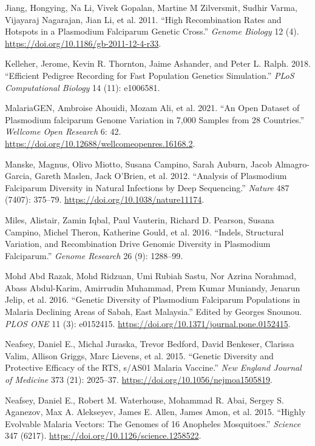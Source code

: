 \documentclass[
  11pt,
]{article}
\newlength{\cslhangindent}
\newenvironment{CSLReferences}[2] %
 {\begin{list}{}{%
  \setlength{\itemindent}{0pt}
  \setlength{\leftmargin}{0pt}
  \setlength{\parsep}{0pt}
  \ifodd #1
   \setlength{\leftmargin}{\cslhangindent}
   \setlength{\itemindent}{-1\cslhangindent}
  \fi
  \setlength{\itemsep}{#2\baselineskip}}}
 {\end{list}}
\begin{document}
\begin{CSLReferences}{1}{0}
Jiang, Hongying, Na Li, Vivek Gopalan, Martine M Zilversmit, Sudhir
Varma, Vijayaraj Nagarajan, Jian Li, et al. 2011. {``High Recombination
Rates and Hotspots in a Plasmodium Falciparum Genetic Cross.''}
\emph{Genome Biology} 12 (4).
\url{https://doi.org/10.1186/gb-2011-12-4-r33}.

Kelleher, Jerome, Kevin R. Thornton, Jaime Ashander, and Peter L. Ralph.
2018. {``Efficient Pedigree Recording for Fast Population Genetics
Simulation.''} \emph{PLoS Computational Biology} 14 (11): e1006581.

MalariaGEN, Ambroise Ahouidi, Mozam Ali, et al. 2021. {``An Open Dataset
of {Plasmodium falciparum} Genome Variation in 7,000 Samples from 28
Countries.''} \emph{Wellcome Open Research} 6: 42.
\url{https://doi.org/10.12688/wellcomeopenres.16168.2}.

Manske, Magnus, Olivo Miotto, Susana Campino, Sarah Auburn, Jacob
Almagro-Garcia, Gareth Maslen, Jack O'Brien, et al. 2012. {``Analysis of
Plasmodium Falciparum Diversity in Natural Infections by Deep
Sequencing.''} \emph{Nature} 487 (7407): 375--79.
\url{https://doi.org/10.1038/nature11174}.

Miles, Alistair, Zamin Iqbal, Paul Vauterin, Richard D. Pearson, Susana
Campino, Michel Theron, Katherine Gould, et al. 2016. {``Indels,
Structural Variation, and Recombination Drive Genomic Diversity in
Plasmodium Falciparum.''} \emph{Genome Research} 26 (9): 1288--99.

Mohd Abd Razak, Mohd Ridzuan, Umi Rubiah Sastu, Nor Azrina Norahmad,
Abass Abdul-Karim, Amirrudin Muhammad, Prem Kumar Muniandy, Jenarun
Jelip, et al. 2016. {``Genetic Diversity of Plasmodium Falciparum
Populations in Malaria Declining Areas of Sabah, East Malaysia.''}
Edited by Georges Snounou. \emph{PLOS ONE} 11 (3): e0152415.
\url{https://doi.org/10.1371/journal.pone.0152415}.

Neafsey, Daniel E., Michal Juraska, Trevor Bedford, David Benkeser,
Clarissa Valim, Allison Griggs, Marc Lievens, et al. 2015. {``Genetic
Diversity and Protective Efficacy of the RTS, s/AS01 Malaria Vaccine.''}
\emph{New England Journal of Medicine} 373 (21): 2025--37.
\url{https://doi.org/10.1056/nejmoa1505819}.

Neafsey, Daniel E., Robert M. Waterhouse, Mohammad R. Abai, Sergey S.
Aganezov, Max A. Alekseyev, James E. Allen, James Amon, et al. 2015.
{``Highly Evolvable Malaria Vectors: The Genomes of 16 Anopheles
Mosquitoes.''} \emph{Science} 347 (6217).
\url{https://doi.org/10.1126/science.1258522}.


\end{CSLReferences}
\end{document}

